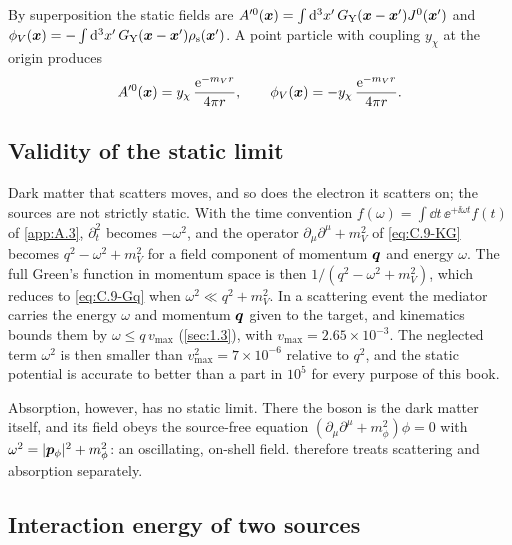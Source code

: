 By superposition the static fields are $A'^0(\bm{x}) = \int\mathrm{d}^3x'\,G_{\mathrm{Y}}(\bm{x} - \bm{x}')J^0(\bm{x}')$ and $\phi_V(\bm{x}) = -\int\mathrm{d}^3x'\,G_{\mathrm{Y}}(\bm{x} - \bm{x}')\rho_{\mathrm{s}}(\bm{x}')$. A point particle with coupling $y_\chi$ at the origin produces
\begin{equation}
  A'^0(\bm{x}) = y_\chi\,\frac{\mathrm{e}^{-m_V r}}{4\pi r}, \qquad \phi_V(\bm{x}) = -y_\chi\,\frac{\mathrm{e}^{-m_V r}}{4\pi r} .
  \label{eq:C.9-point}
\end{equation}

\subsection{Validity of the static limit}

Dark matter that scatters moves, and so does the electron it scatters on; the sources are not strictly static. With the time convention $f(\omega) = \int\dd t\,\ee^{+\ii\omega t}f(t)$ of \cref{app:A.3}, $\partial_t^2$ becomes $-\omega^2$, and the operator $\partial_\mu\partial^\mu + m_V^2$ of \cref{eq:C.9-KG} becomes $q^2 - \omega^2 + m_V^2$ for a field component of momentum $\bm{q}$ and energy $\omega$. The full Green's function in momentum space is then $1/(q^2 - \omega^2 + m_V^2)$, which reduces to \cref{eq:C.9-Gq} when $\omega^2 \ll q^2 + m_V^2$. In a scattering event the mediator carries the energy $\omega$ and momentum $\bm{q}$ given to the target, and kinematics bounds them by $\omega \le q\,v_{\mathrm{max}}$ (\cref{sec:1.3}), with $v_{\mathrm{max}} = 2.65\times10^{-3}$. The neglected term $\omega^2$ is then smaller than $v_{\mathrm{max}}^2 = 7\times10^{-6}$ relative to $q^2$, and the static potential is accurate to better than a part in $10^{5}$ for every purpose of this book.

Absorption, however, has no static limit. There the boson is the dark matter itself, and its field obeys the source-free equation $(\partial_\mu\partial^\mu + m_\phi^2)\phi = 0$ with $\omega^2 = |\bm{p}_\phi|^2 + m_\phi^2$: an oscillating, on-shell field.  therefore treats scattering and absorption separately.

\subsection{Interaction energy of two sources}

